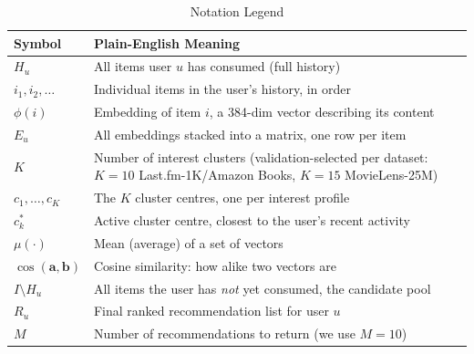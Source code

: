 \documentclass{article}
\begin{document}
\begin{table}[H]
\centering
\caption{Notation Legend}
\label{tab:notation}
\small
\begin{tabular}{@{}l@{\hspace{1.2em}}p{}@{}}
\toprule
\textbf{Symbol} & \textbf{Plain-English Meaning} \\
\midrule
$H_u$ & All items user $u$ has consumed (full history) \\
$i_1, i_2, \ldots$ & Individual items in the user's history, in order \\
$\phi(i)$ & Embedding of item $i$, a 384-dim vector describing its content \\
$E_u$ & All embeddings stacked into a matrix, one row per item \\
$K$ & Number of interest clusters (validation-selected per dataset: $K=10$ Last.fm-1K/Amazon Books, $K=15$ MovieLens-25M) \\
$c_1, \ldots, c_K$ & The $K$ cluster centres, one per interest profile \\
$c_k^*$ & Active cluster centre, closest to the user's recent activity \\
$\mu(\cdot)$ & Mean (average) of a set of vectors \\
$\cos(\mathbf{a},\mathbf{b})$ & Cosine similarity: how alike two vectors are \\
$I \setminus H_u$ & All items the user has \emph{not} yet consumed, the candidate pool \\
$R_u$ & Final ranked recommendation list for user $u$ \\
$M$ & Number of recommendations to return (we use $M=10$) \\
\bottomrule
\end{tabular}
\end{table}
\end{document}
